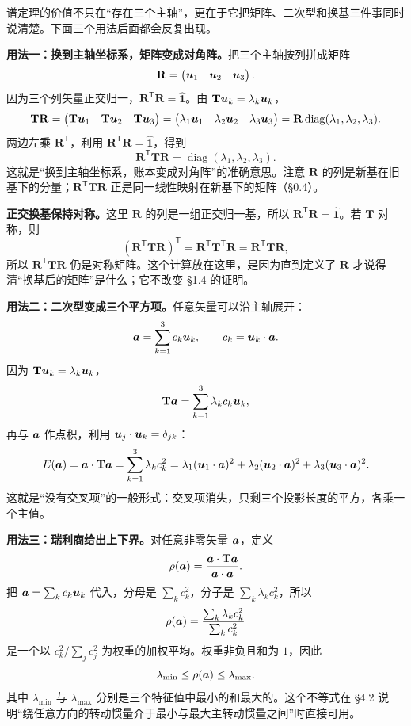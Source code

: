 \documentclass[11pt]{ctexart}
\newcommand{\ten}[1]{\mathbf{#1}}
\newcommand{\unitd}{\hat{\ten{1}}}
\let\origsubhdr\subhdr
\renewcommand{\subhdr}[1]{\par\needspace{3\baselineskip}\origsubhdr{#1}}
\begin{document}
\label{subsec:uses}

谱定理的价值不只在“存在三个主轴”，更在于它把矩阵、二次型和换基三件事同时说清楚。下面三个用法后面都会反复出现。

\textbf{用法一：换到主轴坐标系，矩阵变成对角阵。}把三个主轴按列拼成矩阵
\[
\ten R=\begin{pmatrix}\vect u_1&\vect u_2&\vect u_3\end{pmatrix}.
\]
因为三个列矢量正交归一，$\ten R^{\mathsf T}\ten R=\unitd$。由 $\ten T\vect u_k=\lambda_k\vect u_k$，
\[
\ten T\ten R
=\begin{pmatrix}\ten T\vect u_1&\ten T\vect u_2&\ten T\vect u_3\end{pmatrix}
=\begin{pmatrix}\lambda_1\vect u_1&\lambda_2\vect u_2&\lambda_3\vect u_3\end{pmatrix}
=\ten R\operatorname{diag}(\lambda_1,\lambda_2,\lambda_3).
\]
两边左乘 $\ten R^{\mathsf T}$，利用 $\ten R^{\mathsf T}\ten R=\unitd$，得到
\[
\ten R^{\mathsf T}\ten T\ten R
=\operatorname{diag}(\lambda_1,\lambda_2,\lambda_3).
\]
这就是“换到主轴坐标系，账本变成对角阵”的准确意思。注意 $\ten R$ 的列是新基在旧基下的分量；$\ten R^{\mathsf T}\ten T\ten R$ 正是同一线性映射在新基下的矩阵（\S0.4）。

\textbf{正交换基保持对称。}这里 $\ten R$ 的列是一组正交归一基，所以 $\ten R^{\mathsf T}\ten R=\unitd$。若 $\ten T$ 对称，则
\[
(\ten R^{\mathsf T}\ten T\ten R)^{\mathsf T}
=\ten R^{\mathsf T}\ten T^{\mathsf T}\ten R
=\ten R^{\mathsf T}\ten T\ten R,
\]
所以 $\ten R^{\mathsf T}\ten T\ten R$ 仍是对称矩阵。这个计算放在这里，是因为直到定义了 $\ten R$ 才说得清“换基后的矩阵”是什么；它不改变 \S1.4 的证明。

\textbf{用法二：二次型变成三个平方项。}任意矢量可以沿主轴展开：
\[
\boldsymbol{a}=\sum_{k=1}^{3}c_k\boldsymbol{u}_k,
\qquad
c_k=\boldsymbol{u}_k\cdot\boldsymbol{a} .
\]
因为 $\ten T\vect u_k=\lambda_k\vect u_k$，
\[
\ten T\vect a=\sum_{k=1}^{3}\lambda_k c_k\vect u_k,
\]
再与 $\boldsymbol{a}$ 作点积，利用 $\boldsymbol{u}_j\cdot\boldsymbol{u}_k=\delta_{jk}$：
\[
E(\vect a)=\vect a\cdot\ten T\vect a
=\sum_{k=1}^{3}\lambda_k c_k^2
=\lambda_1(\vect u_1\cdot\vect a)^2
+\lambda_2(\vect u_2\cdot\vect a)^2
+\lambda_3(\vect u_3\cdot\vect a)^2 .
\]
这就是“没有交叉项”的一般形式：交叉项消失，只剩三个投影长度的平方，各乘一个主值。

\textbf{用法三：瑞利商给出上下界。}对任意非零矢量 $\boldsymbol{a}$，定义
\[
\rho(\vect a)=\frac{\vect a\cdot\ten T\vect a}{\vect a\cdot\vect a}.
\]
把 $\boldsymbol{a}=\sum_k c_k\boldsymbol{u}_k$ 代入，分母是 $\sum_k c_k^2$，分子是 $\sum_k\lambda_k c_k^2$，所以
\[
\rho(\boldsymbol{a})
=\frac{\sum_k\lambda_k c_k^2}{\sum_k c_k^2}
\]
是一个以 $c_k^2/\sum_j c_j^2$ 为权重的加权平均。权重非负且和为 $1$，因此
\[
\lambda_{\min}\le\rho(\boldsymbol{a})\le\lambda_{\max}.
\]
其中 $\lambda_{\min}$ 与 $\lambda_{\max}$ 分别是三个特征值中最小的和最大的。这个不等式在 \S4.2 说明“绕任意方向的转动惯量介于最小与最大主转动惯量之间”时直接可用。
\end{document}
